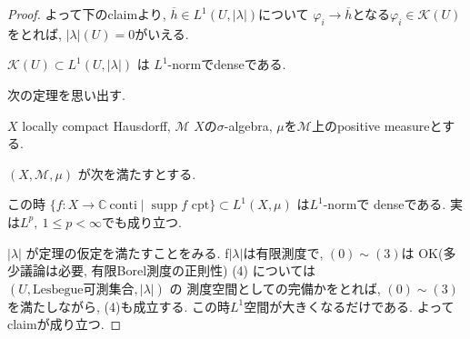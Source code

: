 \begin{proof}
よって下のclaimより, $\overline{h} \in L^1(U,|\lambda|)$について
$\varphi_i \to \overline{h}$となる$\varphi_i \in \mathcal{K}(U)$をとれば, 
$|\lambda|(U)=0$がいえる. 

\begin{claim}
\(\mathcal{K}(U)\subset L^1(U,|\lambda|)\) は
 \(L^1\)-normでdenseである. 
\end{claim}
次の定理を思い出す. 
\begin{tcolorbox}[mybox]
\begin{thm}\cite[Theorem 3.14]{Rud2}
\(X\) locally compact Hausdorff,  \(\mathcal{M}\) $X$の\(\sigma\)-algebra, 
\(\mu\)を\(\mathcal{M}\)上のpositive measureとする. 

 \((X,\mathcal{M},\mu)\) が次を満たすとする.

この時 \(\{f:X\to\mathbb{C}\ \text{conti} \mid \operatorname{supp} f \text{ cpt}\}\subset L^1(X,\mu)\)
は\(L^1\)-normで
denseである. 
実は$L^p,\ 1\leq p<\infty$でも成り立つ. 
\end{thm}
\end{tcolorbox}

\(|\lambda|\) が定理の仮定を満たすことをみる. 
f\(|\lambda|\)は有限測度で, 
$ (0)\sim (3)$は OK(多少議論は必要, 有限Borel測度の正則性)
(4) については \((U,\text{Lesbegue可測集合},|\lambda|)\) の
測度空間としての完備かをとれば, 
\((0)\sim(3)\) を満たしながら, (4)も成立する.
この時$L^1$空間が大きくなるだけである. よってclaimが成り立つ. 
\end{proof}


